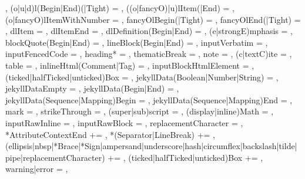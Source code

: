 {{    },
  (o|u|d)l(Begin|End)(|Tight) = {%
    },
  ((o|fancyO)|u)lItem(|End) = {%
    },
  (o|fancyO)lItemWithNumber = {%
    },
  fancyOlBegin(|Tight) = {%
    },
  fancyOlEnd(|Tight) = {%
    },
  dlItem = {%
    },
  dlItemEnd = {%
    },
  dlDefinition(Begin|End) = {%
    },
  (e|strongE)mphasis = {%
    },
  blockQuote(Begin|End) = {%
    },
  lineBlock(Begin|End) = {%
    },
  inputVerbatim = {%
    },
  inputFencedCode = {%
    },
  heading* = {%
    },
  thematicBreak = {%
    },
  note = {%
    },
  (c|textC)ite = {%
    },
  table = {%
    },
  inlineHtml(Comment|Tag) = {%
    },
  inputBlockHtmlElement = {%
    },
  (ticked|halfTicked|unticked)Box = {%
    },
  jekyllData(Boolean|Number|String) = {%
    },
  jekyllDataEmpty = {%
    },%
  jekyllData(Begin|End) = {%
    },
  jekyllData(Sequence|Mapping)Begin = {%
    },
  jekyllData(Sequence|Mapping)End = {%
    },
  mark = {%
    },
  strikeThrough = {%
    },
  (super|sub)script = {%
    },
  (display|inline)Math = {%
    },
  inputRawInline = {%
    },
  inputRawBlock = {%
    },
  replacementCharacter = {%
    },
  *AttributeContextEnd += {\GOBBLE},
  *(Separator|LineBreak) += {\GOBBLE},
  (ellipsis|nbsp|*Brace|*Sign|ampersand|underscore|hash|circumflex|backslash|tilde|pipe|replacementCharacter) += {\GOBBLE},
  (ticked|halfTicked|unticked)Box += {\GOBBLE},
  warning|error = {%
    },
}%
